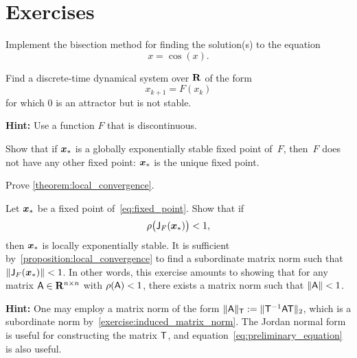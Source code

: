\section{Exercises}

\begin{compexercise}
Implement the bisection method for finding the solution(s) to the equation
\[
    x = \cos(x).
\]
\end{compexercise}

\begin{exercise}
    Find a discrete-time dynamical system over $\mathbf R$ of the form
    \[
        x_{k+1} = F(x_{k})
    \]
    for which $0$ is an attractor but is not stable.

    \noindent \textbf{Hint:} Use a function $F$ that is discontinuous.
\end{exercise}

\begin{exercise}
    \label{exercise:global_exponential_stability}
    Show that if $\mathbf{\boldsymbol{x}}_*$ is a globally exponentially stable fixed point of~$F$,
    then~$F$ does not have any other fixed point: $\mathbf{\boldsymbol{x}}_*$ is the unique fixed point.
\end{exercise}

\begin{exercise}
    \label{exercise:prove_local_convergence}
    Prove \cref{theorem:local_convergence}.
\end{exercise}

\begin{exercise}
    \label{exercise:spectral_and_norm}
    Let $\mathbf{\boldsymbol{x}}_*$ be a fixed point of~\eqref{eq:fixed_point}.
    Show that if
    \[
        \rho\bigl(\mathsf J_F(\mathbf{\boldsymbol{x}}_*)\bigr) < 1,
    \]
    then $\mathbf{\boldsymbol{x}}_*$ is locally exponentially stable.
    It is sufficient by~\cref{proposition:local_convergence} to find a subordinate matrix norm such that $\lVert\mathsf J_F(\mathbf{\boldsymbol{x}}_*)\rVert < 1$.
    In other words, this exercise amounts to showing that for any matrix $\mathsf A \in \mathbf R^{n \times n}$ with $\rho(\mathsf A) < 1$,
    there exists a matrix norm such that $\lVert\mathsf A\rVert < 1$.

    \noindent \textbf{Hint:} One may employ a matrix norm of the form $\lVert\mathsf A\rVert_{\mathsf T} := \lVert\mathsf T^{-1} \mathsf A \mathsf T\rVert_2$,
    which is a subordinate norm by~\cref{exercise:induced_matrix_norm}.
    The Jordan normal form is useful for constructing the matrix $\mathsf T$,
    and equation~\eqref{eq:preliminary_equation} is also useful.
\end{exercise}

